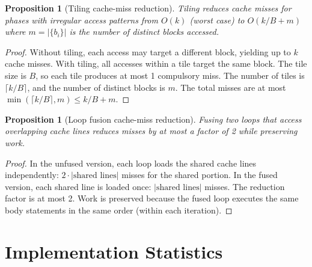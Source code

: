 \documentclass[11pt]{article}
\newtheorem{proposition}[theorem]{Proposition}
\begin{document}
\begin{proposition}[Tiling cache-miss reduction]
Tiling reduces cache misses for phases with irregular access patterns
from $O(k)$ (worst case) to $O(k/B + m)$ where $m = |\{b_i\}|$ is the
number of distinct blocks accessed.
\end{proposition}

\begin{proof}
Without tiling, each access may target a different block, yielding up to
$k$ cache misses.  With tiling, all accesses within a tile target the same
block.  The tile size is $B$, so each tile produces at most 1 compulsory
miss.  The number of tiles is $\lceil k/B \rceil$, and the number of
distinct blocks is $m$.  The total misses are at most
$\min(\lceil k/B \rceil, m) \le k/B + m$.
\end{proof}

\begin{proposition}[Loop fusion cache-miss reduction]
Fusing two loops that access overlapping cache lines reduces misses by
at most a factor of 2 while preserving work.
\end{proposition}

\begin{proof}
In the unfused version, each loop loads the shared cache lines independently:
$2 \cdot |\text{shared lines}|$ misses for the shared portion.  In the fused
version, each shared line is loaded once: $|\text{shared lines}|$ misses.
The reduction factor is at most 2.  Work is preserved because the fused loop
executes the same body statements in the same order (within each iteration).
\end{proof}

\section{Implementation Statistics}
\label{app:implementation}
\end{document}
